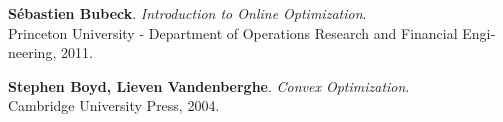 

\newcommand{\bibauthors}[1]{\textbf{#1}}
\newcommand{\bibtitle}[1]{\textit{#1}}
\newcommand{\bibpublication}[1]{\textnormal{#1}}


\begin{thebibliography}{9}
\begin{latin}

\bibauthors{ S\'ebastien Bubeck}. 
\bibtitle{Introduction to Online Optimization}.\\
\bibpublication{Princeton University - Department of Operations Research and Financial Engineering, 2011.}

\bibauthors{Stephen Boyd, Lieven Vandenberghe}. 
\bibtitle{Convex Optimization}.\\
\bibpublication{Cambridge University Press, 2004.}


 

\end{latin}
\end{thebibliography}